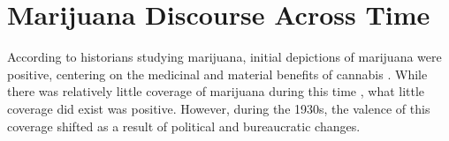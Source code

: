 







\section{Marijuana Discourse Across Time}


According to historians studying marijuana, initial depictions of marijuana were positive, centering on the medicinal and material benefits of cannabis \citep{bonnie_and_whitebread_1970,rosenthal_and_kubby_1996}. While there was relatively little coverage of marijuana during this time \citep{bonnie_and_whitebread_1970,mosher_and_akins_2019}, what little coverage did exist was positive. However, during the 1930s, the valence of this coverage shifted as a result of political and bureaucratic changes. 


